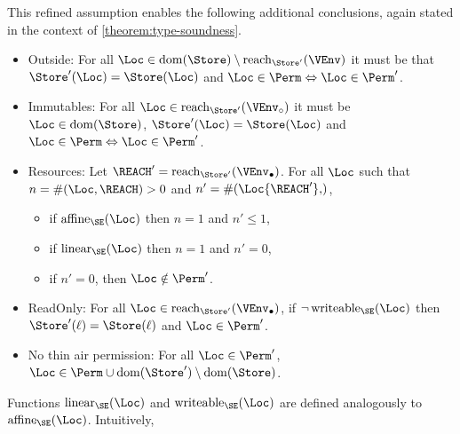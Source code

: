This refined assumption enables the following additional conclusions,
again stated in the context of \cref{theorem:type-soundness}.
\begin{itemize}
\item Outside: For all $\Loc \in \Dom{\Store} \setminus
  \Reach{\Store'}{\VEnv}$ it must be that 
  $\Store' (\Loc) = \Store (\Loc)$
  and $\Loc\in\Perm \Leftrightarrow \Loc\in\Perm'$.
\item Immutables: For all $\Loc \in
  \Reach{\Store'}{\ImmutableBorrows\VEnv}$ it must be 
  $\Loc\in\Dom\Store$, 
  $\Store' (\Loc) = \Store (\Loc)$
  and $\Loc\in\Perm \Leftrightarrow \Loc\in\Perm'$.
\item Resources:
  Let $\REACH' =\Reach{\Store'}{\Active\VEnv}$.
  For all $\Loc$ such that $n= \MultiNumber\Loc\REACH >0$ and $n' =
  \MultiNumber\Loc{\REACH'}$, 
  \begin{itemize}
  \item if $\Affine{\SE}\Loc$ then $n=1$ and $n'\le 1$,
  \item if $\Linear{\SE}\Loc$ then $n=1$ and $n' = 0$,
  \item if $n'=0$, then $\Loc\notin\Perm'$.
  \end{itemize}
\item ReadOnly: For all $\Loc \in \Reach
  {\Store'}{\Active\VEnv}$, if $\neg\Writeable{\SE}\Loc$ then
  $\Store' (\ell) = \Store (\ell)$ and $\Loc\in \Perm'$.
\item No thin air permission: For all $\Loc\in \Perm'$, $\Loc
  \in \Perm \cup  \Dom{\Store'} \setminus \Dom{\Store}$.
\end{itemize}
Functions $\Linear{\SE}\Loc$ and $\Writeable\SE\Loc$ are defined analogously to
$\Affine{\SE}\Loc$. Intuitively, 


